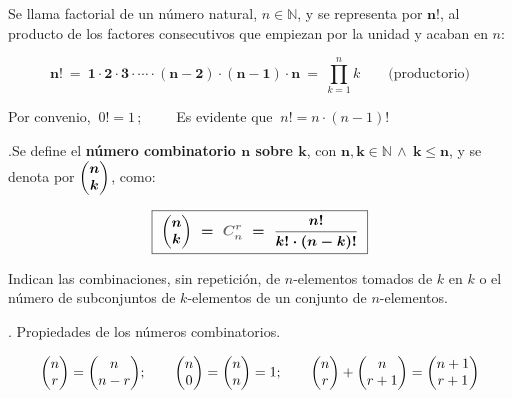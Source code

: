 \begin{definition}
	
	Se llama factorial de un número natural, $n\in \mathbb N$, y se representa por $\boldsymbol{n!}$, al producto de los factores consecutivos que empiezan por la unidad y acaban en $n$:
	
	$$\boldsymbol{ n! \ = \ 1\cdot 2 \cdot 3 \cdot \cdots \cdot (n-2) \cdot (n-1)\cdot n } \ = \ \displaystyle \prod_{k=1}^n k \qquad \text{(productorio)}$$
	
Por convenio, $\ 0!=1\, ; \qquad $ Es evidente que $\ n!=n\cdot (n-1)!$
\end{definition}


\begin{definition}
	.Se define el \textbf{número combinatorio $\boldsymbol{n}$ sobre $\boldsymbol{k}$}, con $\boldsymbol{n,k \in \mathbb N \, \wedge \ k\le n}$, y se denota por $\boldsymbol{\mqty(n\\k)}$, como:
	
	\vspace{2mm} $$\boxed{\ \boldsymbol{ \mqty(n\\k) \ = \ \textcolor{gris}{C_n^r} \ = \ \dfrac {n!}{k! \cdot (n-k)!} }	 \ }$$
	
	\vspace{2mm} Indican las combinaciones, sin repetición, de $n$-elementos tomados de $k$ en $k$ o el número de subconjuntos de $k$-elementos de un conjunto de $n$-elementos.
\end{definition}

\begin{theorem}
	. Propiedades de los números combinatorios.
	
	\begin{small}
	$$\mqty(n\\r)=\mqty(n\\n-r); \qquad \mqty(n\\0)=\mqty(n\\n)=1; \qquad \mqty(n\\r)+\mqty(n\\r+1)=\mqty(n+1\\r+1)$$
	\end{small}	
\end{theorem}

